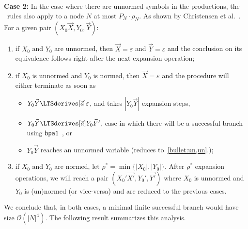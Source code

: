 \noindent\textbf{Case 2:} In the case where there are unnormed symbols
in the productions, the \BPA\ rules also apply to a node $N$ at most
$P_N\cdot \rho_N$.
As shown by Christensen et 
al.~\cite{DBLP:journals/iandc/ChristensenHS95}.
For a given pair $(X_0\vec X, Y_0,\vec Y)$:
\begin{enumerate}
	\item \label{bullet:un,un}  if $X_0$ and $Y_0$ are unnormed, then 
		  $\vec X = \varepsilon$
		  and $\vec Y = \varepsilon$ and the conclusion on its equivalence
		  follows right after the next expansion operation;
	\item if $X_0$ is unnormed and $Y_0$ is normed, then $\vec X = \varepsilon$
		  and the procedure will either terminate as soon as
		  \begin{itemize}
		  	\item $Y_0\vec Y\LTSderives[\vec a] \varepsilon$, and takes 
		  		  $|Y_0\vec Y|$ expansion steps,
		  	\item $Y_0\vec Y\LTSderives[\vec a] Y_0\vec Y'$, case in which
		  		  there will be a successful branch using 
		  		  \lstinline{bpa1}~\cite{DBLP:journals/iandc/ChristensenHS95}, or
		  	\item $Y_0\vec Y$ reaches an unnormed variable 
		  		  (reduces to~\ref{bullet:un,un}.);
		  \end{itemize}
	\item if $X_0$ and $Y_0$ are normed, let 
		  $\rho^* = \min \{|X_0|, |Y_0|\}$. After $\rho^*$ expansion
		  operations, we will reach a pair $(X_0'\vec{X'}, Y_0',\vec{Y'})$
		  where $X_0$ is unnormed and $Y_0$ is (un)normed (or vice-versa)
		  and are reduced to the previous cases.
\end{enumerate}


We conclude that, in both cases, a minimal finite successful branch would
have size $\mathcal{O}(|N|^4)$. The following result summarizes this
analysis.

